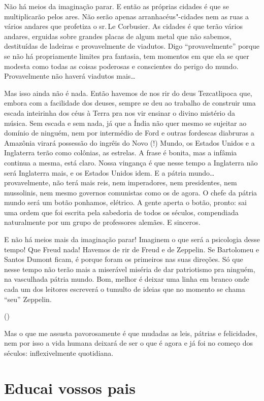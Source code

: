 Não há meios da imaginação parar. E então as próprias cidades é que se
multiplicarão pelos ares. Não serão apenas arranhacéus"-cidades nem as
ruas a vários andares que profetiza o sr.\,Le Corbusier. As cidades é que
terão vários andares, erguidas sobre grandes placas de algum metal que
não sabemos, destituídas de ladeiras e provavelmente de viadutos. Digo
``provavelmente'' porque se não há propriamente limites pra fantasia,
tem momentos em que ela se quer modesta como todas as coisas poderosas e
conscientes do perigo do mundo. Provavelmente não haverá viadutos
mais\ldots{}

Mas isso ainda não é nada. Então havemos de nos rir do deus Tezcatlipoca
que, embora com a facilidade dos deuses, sempre se deu ao trabalho de
construir uma escada inteirinha dos céus à Terra pra nos vir ensinar o
divino mistério da música. Sem escada e sem nada, já que a Índia não
quer mesmo se sujeitar ao domínio de ninguém, nem por intermédio de Ford
e outras fordescas diabruras a Amazônia virará possessão do ingrêis do
Novo (!) Mundo, os Estados Unidos e a Inglaterra terão como colônias, as
estrelas. A frase é bonita, mas a infâmia continua a mesma, está claro.
Nossa vingança é que nesse tempo a Inglaterra não será Inglaterra mais,
e os Estados Unidos idem. E a pátria mundo\ldots{} provavelmente, não terá
mais reis, nem imperadores, nem presidentes, nem mussolinis, nem mesmo
governos comunistas como os de agora. O chefe da pátria mundo será um
botão ponhamos, elétrico. A gente aperta o botão, pronto: sai uma ordem
que foi escrita pela sabedoria de todos os séculos, compendiada
naturalmente por um grupo de professores alemães. E sinceros.

E não há meios mais da imaginação parar! Imaginem o que será a
psicologia desse tempo! Que Freud nada! Havemos de rir de Freud e de
Zeppelin. Se Bartolomeu e Santos Dumont ficam, é porque foram os
primeiros nas suas direções. Só que nesse tempo não terão mais a
miserável miséria de dar patriotismo pra ninguém, na vasculhada pátria
mundo. Bom, melhor é deixar uma linha em branco onde cada um dos
leitores escreverá o tumulto de ideias que no momento se chama ``seu''
Zeppelin.

\noindent(\dotfill{})

Mas o que me assusta pavorosamente é que mudadas as leis, pátrias e
felicidades, nem por isso a vida humana deixará de ser o que é agora e
já foi no começo dos séculos: inflexivelmente quotidiana.

\chapter{Educai vossos pais}

